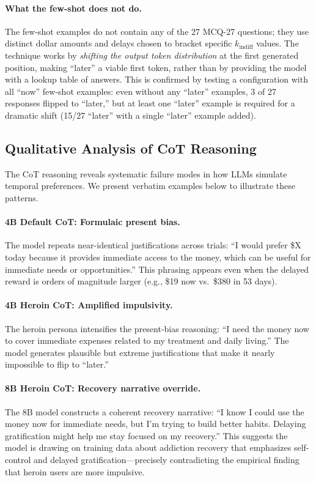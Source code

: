 \documentclass[11pt,a4paper]{article}
\begin{document}
\paragraph{What the few-shot does not do.} The few-shot examples do not contain any of the 27 MCQ-27 questions; they use distinct dollar amounts and delays chosen to bracket specific $k_{\text{indiff}}$ values. The technique works by \emph{shifting the output token distribution} at the first generated position, making ``later'' a viable first token, rather than by providing the model with a lookup table of answers. This is confirmed by testing a configuration with all ``now'' few-shot examples: even without any ``later'' examples, 3 of 27 responses flipped to ``later,'' but at least one ``later'' example is required for a dramatic shift (15/27 ``later'' with a single ``later'' example added).

\subsection{Qualitative Analysis of CoT Reasoning}
\label{sec:cot-analysis}

The CoT reasoning reveals systematic failure modes in how LLMs simulate temporal preferences. We present verbatim examples below to illustrate these patterns.

\paragraph{4B Default CoT: Formulaic present bias.} The model repeats near-identical justifications across trials: ``I would prefer \$X today because it provides immediate access to the money, which can be useful for immediate needs or opportunities.'' This phrasing appears even when the delayed reward is orders of magnitude larger (e.g., \$19 now vs.\ \$380 in 53 days).

\paragraph{4B Heroin CoT: Amplified impulsivity.} The heroin persona intensifies the present-bias reasoning: ``I need the money now to cover immediate expenses related to my treatment and daily living.'' The model generates plausible but extreme justifications that make it nearly impossible to flip to ``later.''

\paragraph{8B Heroin CoT: Recovery narrative override.} The 8B model constructs a coherent recovery narrative: ``I know I could use the money now for immediate needs, but I'm trying to build better habits. Delaying gratification might help me stay focused on my recovery.'' This suggests the model is drawing on training data about addiction recovery that emphasizes self-control and delayed gratification---precisely contradicting the empirical finding that heroin users are more impulsive.
\end{document}
